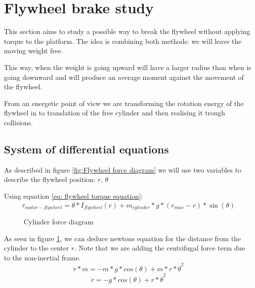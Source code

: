 \section{Flywheel brake study}

This section aims to study a possible way to break the flywheel without applying torque to the platform. The idea is combining both methods:
we will leave the moving weight free.

This way, when the weight is going upward will have a larger radius than when is going downward and will produce an average moment against the movement of the flywheel.

From an energetic point of view we are transforming the rotation energy of the flywheel in to translation of the free cylinder and then realising it trough collisions.
\subsection{System of differential equations}
As described in figure \ref{fig:Flywheel force diagram} we will use two variables to describe the flywheel position: $r$, $\theta$ 

Using equation \ref{eq: flywheel torque equation}:
\[\tau_{motor-flywheel} = \ddot{\theta}*I_{flywheel}(r) + m_{cylinder} * g * 
(r_{max} - r) * \sin({\theta})  \]
\begin{figure}[H]
	\centering
	\caption{Cylinder force diagram}
	\label{fig:Cylinder force diagram}
\end{figure}

As seen in figure \ref{fig:Cylinder force diagram}, we can deduce newtons equation for the distance from the cylinder to the center $r$. Note that we are adding the centrifugal force term due to the non-inertial frame.
\[\ddot{r} * m = -m * g * cos(\theta) + m * r * \dot{\theta}^2 \]
\[\ddot{r} = -g * cos(\theta) + r * \dot{\theta}^2 \]

